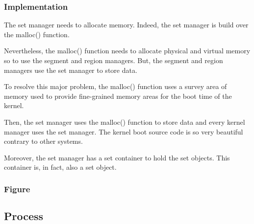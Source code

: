 
\begin{frame}
  \frametitle{Implementation}

  The set manager needs to allocate memory. Indeed, the set manager
  is build over the malloc() function.

  \nl

  Nevertheless, the malloc() function needs to allocate physical and
  virtual memory so to use the segment and region managers. But, the
  segment and region managers use the set manager to store data.

  \nl

  To resolve this major problem, the malloc() function uses a survey area
  of memory used to provide fine-grained memory areas for the boot time
  of the kernel.

  \nl

  Then, the set manager uses the malloc() function to store data and
  every kernel manager uses the set manager. The kernel boot source code
  is so very beautiful contrary to other systems.

  \nl

  Moreover, the set manager has a set container to hold the set objects. This
  container is, in fact, also a set object.
\end{frame}


\begin{frame}
  \frametitle{Figure}

  \begin{center}
  \end{center}
\end{frame}

%
%

\subsection{Process}


